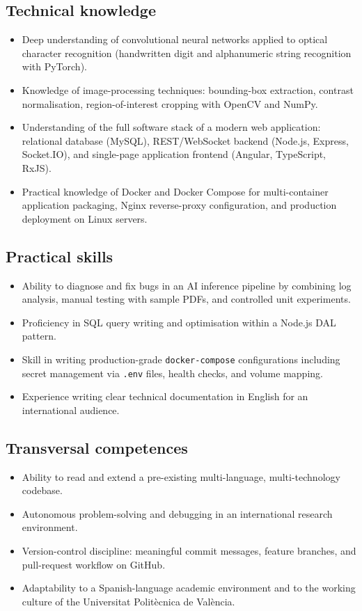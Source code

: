 \documentclass[a4paper,11pt]{article}
\begin{document}
\subsection*{Technical knowledge}
\begin{itemize}[leftmargin=1.5em, itemsep=2pt]
  \item Deep understanding of convolutional neural networks applied to optical character recognition
        (handwritten digit and alphanumeric string recognition with PyTorch).
  \item Knowledge of image-processing techniques: bounding-box extraction, contrast normalisation,
        region-of-interest cropping with OpenCV and NumPy.
  \item Understanding of the full software stack of a modern web application:
        relational database (MySQL), REST/WebSocket backend (Node.js, Express, Socket.IO),
        and single-page application frontend (Angular, TypeScript, RxJS).
  \item Practical knowledge of Docker and Docker Compose for multi-container application
        packaging, Nginx reverse-proxy configuration, and production deployment on Linux servers.
\end{itemize}

\subsection*{Practical skills}
\begin{itemize}[leftmargin=1.5em, itemsep=2pt]
  \item Ability to diagnose and fix bugs in an AI inference pipeline by combining log analysis,
        manual testing with sample PDFs, and controlled unit experiments.
  \item Proficiency in SQL query writing and optimisation within a Node.js DAL pattern.
  \item Skill in writing production-grade \texttt{docker-compose} configurations including
        secret management via \texttt{.env} files, health checks, and volume mapping.
  \item Experience writing clear technical documentation in English for an international audience.
\end{itemize}

\subsection*{Transversal competences}
\begin{itemize}[leftmargin=1.5em, itemsep=2pt]
  \item Ability to read and extend a pre-existing multi-language, multi-technology codebase.
  \item Autonomous problem-solving and debugging in an international research environment.
  \item Version-control discipline: meaningful commit messages, feature branches, and pull-request
        workflow on GitHub.
  \item Adaptability to a Spanish-language academic environment and to the working culture of
        the Universitat Politècnica de València.
\end{itemize}
\end{document}
